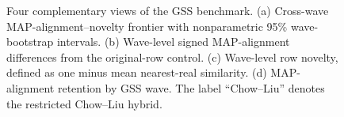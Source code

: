 \documentclass[10pt,onecolumn]{IEEEtran}
\begin{document}
\pagestyle{empty}

\begin{figure}
\centering

\caption{Four complementary views of the GSS benchmark. (a) Cross-wave MAP-alignment--novelty frontier with nonparametric 95\% wave-bootstrap intervals. (b) Wave-level signed MAP-alignment differences from the original-row control. (c) Wave-level row novelty, defined as one minus mean nearest-real similarity. (d) MAP-alignment retention by GSS wave. The label ``Chow--Liu'' denotes the restricted Chow--Liu hybrid.}
\label{fig:gss_benchmark_four_panel}
\end{figure}
\end{document}
